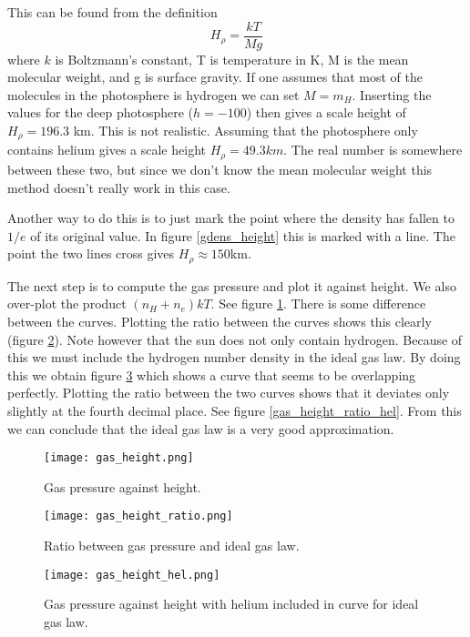 \documentclass{aa}   %
\begin{document}
This can be found from the definition
\begin{equation}
 H_\rho = \frac{kT}{M g}
\end{equation}
where $k$ is Boltzmann's constant, T is temperature in K, M is the mean molecular weight, and g is surface gravity.
If one assumes that most of the molecules in the photosphere is hydrogen we can set $M=m_H$. Inserting the values for the deep photosphere ($h = -100$) then gives a scale height of $H_\rho = 196.3$ km. This is not realistic. Assuming that the photosphere only contains helium gives a scale height $H_\rho = 49.3 km$. The real number is somewhere between these two, but since we don't know the mean molecular weight this method doesn't really work in this case.

Another way to do this is to just mark the point where the density has fallen to $1/e$ of its original value. In figure \ref{gdens_height} this is marked with a line. The point the two lines cross gives $H_\rho \approx 150 $km.

The next step is to compute the gas pressure and plot it against height. We also over-plot the product $(n_H + n_e)kT$. See figure \ref{gas_height}. There is some difference between the curves. Plotting the ratio between the curves shows this clearly (figure \ref{gas_height_ratio}). Note however that the sun does not only contain hydrogen. Because of this we must include the hydrogen number density in the ideal gas law. By doing this we obtain figure \ref{gas_height_hel} which shows a curve that seems to be overlapping perfectly. Plotting the ratio between the two curves shows that it deviates only slightly at the fourth decimal place. See figure \ref{gas_height_ratio_hel}. From this we can conclude that the ideal gas law is a very good approximation.

\begin{figure}
 \texttt{[image: gas\_height.png]}
 \caption{Gas pressure against height.}
 \label{gas_height} 
\end{figure}

\begin{figure}
 \texttt{[image: gas\_height\_ratio.png]}
 \caption{Ratio between gas pressure and ideal gas law.}
 \label{gas_height_ratio} 
\end{figure}

\begin{figure}
 \texttt{[image: gas\_height\_hel.png]}
 \caption{Gas pressure against height with helium included in curve for ideal gas law.}
 \label{gas_height_hel} 
\end{figure}
\end{document}

